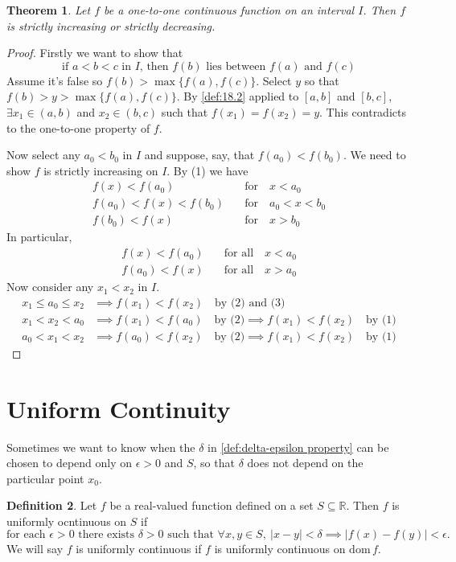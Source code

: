 \documentclass[12pt, lettersize]{book}
\theoremstyle{plain}
\newtheorem{thm}{Theorem}[section]
\theoremstyle{definition}
\newtheorem{dfn}[thm]{Definition}
\theoremstyle{remark}
\newcommand{\R}{\mathbb{R}}
\newcommand{\dom}{\text{dom}\,}
\begin{document}
			\setcounter{equation}{0}
			\begin{thm}
			Let $f$ be a \emph{one-to-one} continuous function on an interval $I$. Then $f$ is strictly increasing or strictly decreasing.
			\end{thm}
			\begin{proof}
			Firstly we want to show that
			\begin{equation}
				\text{if $a<b<c$ in $I$, then $f(b)$ lies between $f(a)$ and $f(c)$}
			\end{equation}
			Assume it's false so $f(b)>\max\{f(a),f(c)\}$. Select $y$ so that $f(b)>y>\max\{f(a),f(c)\}$. By \ref{def:18.2} applied to $[a,b]$ and $[b,c]$, $\exists x_1\in(a,b)$ and $x_2\in(b,c)$ such that $f(x_1)=f(x_2)=y$. This contradicts to the one-to-one property of $f$. 
			
			Now select any $a_0<b_0$ in $I$ and suppose, say, that $f(a_0)<f(b_0)$. We need to show $f$ is strictly increasing on $I$. By (1) we have
			\begin{align*}
				f(x)<f(a_0)\quad&\text{for}\quad x<a_0\\
				f(a_0)<f(x)<f(b_0)\quad&\text{for}\quad a_0<x<b_0\\
				f(b_0)<f(x)\quad&\text{for}\quad x>b_0
			\end{align*}
			In particular,
			\begin{align}
				f(x)<f(a_0)\quad&\text{for all}\quad x<a_0\\
				f(a_0)<f(x)\quad&\text{for all}\quad x>a_0
			\end{align}
			Now consider any $x_1<x_2$ in $I$.
			\begin{align*}
				x_1\leq a_0\leq x_2 &\implies f(x_1)<f(x_2)\quad\text{by (2) and (3)}\\
				x_1<x_2<a_0&\implies f(x_1)<f(a_0)\quad\text{by (2)} \implies f(x_1)<f(x_2)\quad\text{by (1)}\\
				a_0<x_1<x_2&\implies f(a_0)<f(x_2)\quad\text{by (2)} \implies f(x_1)<f(x_2)\quad\text{by (1)}
			\end{align*}
			\end{proof}
			\newpage
		\section{Uniform Continuity}
			Sometimes we want to know when the $\delta$ in \ref{def:delta-epsilon property} can be chosen to depend only on
			$\epsilon>0$ and $S$, so that $\delta$ does not depend on the particular point $x_0$.
			\begin{dfn}
			Let $f$ be a real-valued function defined on a set $S\subseteq\R$. Then $f$ is uniformly ocntinuous on $S$ if
			\begin{displaymath}
				\text{for each $\epsilon>0$ there exists $\delta>0$ such that $\forall x,y\in S,\ |x-y|<\delta\implies|f(x)-f(y)|<\epsilon.$}
			\end{displaymath}
			We will say $f$ is uniformly continuous if $f$ is uniformly continuous on $\dom f$.
			\end{dfn}
			
\end{document}
